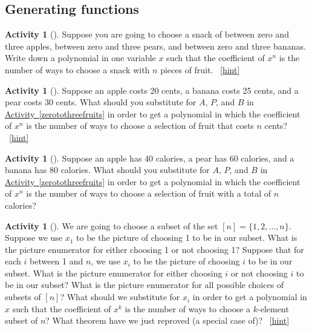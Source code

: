 \documentclass[10pt,]{book}
\theoremstyle{plain}
\theoremstyle{definition}
\theoremstyle{definition}
\theoremstyle{definition}
\newtheorem{activity}[project]{Activity}
\numberwithin{equation}{chapter}
\begin{document}
\subsection[{Generating functions}]{Generating functions}\label{subsection-21}
\begin{activity}[]\label{activity-179}
\hypertarget{p-853}{}%
Suppose you are going to choose a snack of between zero and three apples, between zero and three pears, and between zero and three bananas. Write down a polynomial in one variable \(x\) such that the coefficient of \(x^n\) is the number of ways to choose a snack with \(n\) pieces of fruit.%
~\hfill{\tiny\hyperlink{a-179}{[hint]}\hypertarget{q-179}{}}\end{activity}
\begin{activity}[]\label{activity-180}
\hypertarget{p-856}{}%
Suppose an apple costs 20 cents, a banana costs 25 cents, and a pear costs 30 cents. What should you substitute for \(A\), \(P\), and \(B\) in \hyperref[zerotothreefruits]{Activity~\ref{zerotothreefruits}} in order to get a polynomial in which the coefficient of \(x^n\) is the number of ways to choose a selection of fruit that costs \(n\) cents?%
~\hfill{\tiny\hyperlink{a-180}{[hint]}\hypertarget{q-180}{}}\end{activity}
\begin{activity}[]\label{activity-181}
\hypertarget{p-859}{}%
Suppose an apple has 40 calories, a pear has 60 calories, and a banana has 80 calories. What should you substitute for \(A\), \(P\), and \(B\) in \hyperref[zerotothreefruits]{Activity~\ref{zerotothreefruits}} in order to get a polynomial in which the coefficient of \(x^n\) is the number of ways to choose a selection of fruit with a total of \(n\) calories?%
\end{activity}
\begin{activity}[]\label{reprovingbinomialtheorem}
\hypertarget{p-861}{}%
We are going to choose a subset of the set \([n]=\{1,2,\ldots, n\}\). Suppose we use \(x_1\) to be the picture of choosing 1 to be in our subset. What is the picture enumerator for either choosing 1 or not choosing 1? Suppose that for each \(i\) between 1 and \(n\), we use \(x_i\) to be the picture of choosing \(i\) to be in our subset. What is the picture enumerator for either choosing \(i\) or not choosing \(i\) to be in our subset? What is the picture enumerator for all possible choices of subsets of \([n]\)? What should we substitute for \(x_i\) in order to get a polynomial in \(x\) such that the coefficient of \(x^k\) is the number of ways to choose a \(k\)-element subset of \(n\)? What theorem have we just reproved (a special case of)?%
~\hfill{\tiny\hyperlink{a-182}{[hint]}\hypertarget{q-182}{}}\end{activity}
\end{document}

